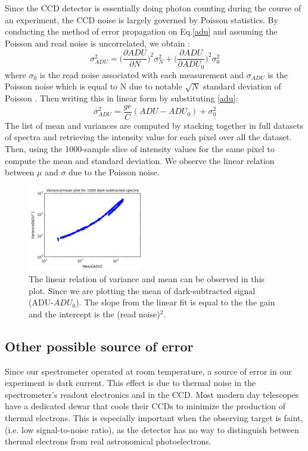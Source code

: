 \documentclass[authoryear, 12pt,5p, times]{elsarticle}
\begin{document}
Since the CCD detector is essentially doing photon counting during the course of an experiment, the CCD noise is largely governed by Poisson statistics. By conducting the method of error propagation on Eq.\ref{adu} and assuming the Poisson and read noise is uncorrelated, we obtain :
\begin{equation}
\sigma^2_{ADU} = \Bigg(\frac{\partial ADU}{\partial N}\Bigg)^2 \sigma_N^2 +\Bigg(\frac{\partial ADU}{\partial ADU_0}\Bigg)^2\sigma_0^2
\label{error}
\end{equation}
where $\sigma_0$ is the read noise associated with each measurement and $\sigma_{ADU}$ is the   Poisson noise which is equal to N due to notable  $\sqrt{N}$ standard deviation of Poisson . Then writing this in linear form by substituting \ref{adu}:
\begin{equation}
\sigma^2_{ADU}=\frac{ge}{C}(ADU- ADU_0)+\sigma_0^2
\label{linear_error_relation}
\end{equation}
The list of mean and variances are computed by stacking together in full datasets  of spectra and retrieving the intensity value for each pixel over all the dataset. Then, using the 1000-sample slice of intensity values for the same pixel to compute the mean and standard deviation. We observe the linear relation between $\mu$ and $\sigma$ due to the Poisson noise. 
 \begin{figure}[h!]\includegraphics[width=0.45\textwidth]{figures/varmeanplot}
\caption{The linear relation of variance and mean can be observed in this plot. Since we are plotting the mean of dark-subtracted signal (ADU-$ADU_0$). The slope from the linear fit is equal to the the gain and the intercept is the (read noise)$^2$.} \label{varmean}
\end{figure}
\subsection{Other possible source of error}
Since our spectrometer operated at room temperature, a source of error in our experiment is dark current. This effect is due to thermal noise in the spectrometer's readout electronics and in the CCD. Most modern day telescopes have a dedicated dewar that cools their CCDs to minimize the production of thermal electrons. This is especially important when the observing target is faint, (i.e. low signal-to-noise ratio), as the detector has no way to distinguish between thermal electrons from real astronomical photoelectrons.
\end{document}
